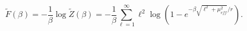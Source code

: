 \begin{equation}
\widetilde{F}\left(\beta \right)=-\frac{1}{\beta }\log \widetilde{Z}\left(\beta \right)=-\frac{1}{\beta }\sum _{\ell =1}^{\infty }\ell ^{2}\log \left(1-e^{-\beta \sqrt{\ell ^{2}+\mu _{eff}^{2}}/r}\right). \end{equation}

